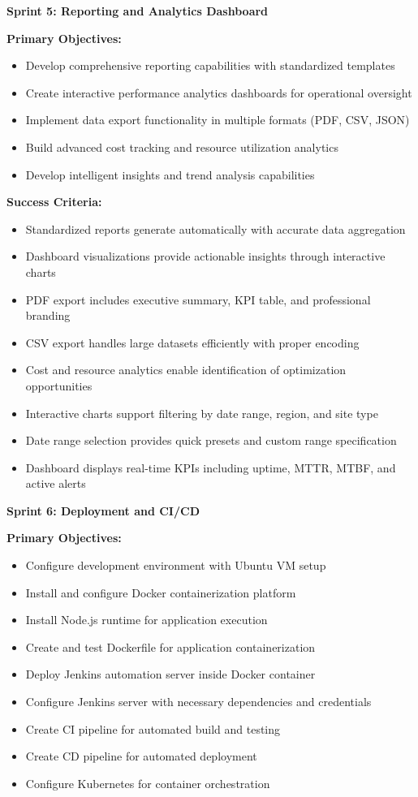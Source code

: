 \vspace{0.3cm}

\textbf{Sprint 5: Reporting and Analytics Dashboard}

\textbf{Primary Objectives:}
\begin{itemize}
\item Develop comprehensive reporting capabilities with standardized templates
\item Create interactive performance analytics dashboards for operational oversight
\item Implement data export functionality in multiple formats (PDF, CSV, JSON)
\item Build advanced cost tracking and resource utilization analytics
\item Develop intelligent insights and trend analysis capabilities
\end{itemize}

\textbf{Success Criteria:}
\begin{itemize}
\item Standardized reports generate automatically with accurate data aggregation
\item Dashboard visualizations provide actionable insights through interactive charts
\item PDF export includes executive summary, KPI table, and professional branding
\item CSV export handles large datasets efficiently with proper encoding
\item Cost and resource analytics enable identification of optimization opportunities
\item Interactive charts support filtering by date range, region, and site type
\item Date range selection provides quick presets and custom range specification
\item Dashboard displays real-time KPIs including uptime, MTTR, MTBF, and active alerts
\end{itemize}

\vspace{0.3cm}

\textbf{Sprint 6: Deployment and CI/CD}

\textbf{Primary Objectives:}
\begin{itemize}
\item Configure development environment with Ubuntu VM setup
\item Install and configure Docker containerization platform
\item Install Node.js runtime for application execution
\item Create and test Dockerfile for application containerization
\item Deploy Jenkins automation server inside Docker container
\item Configure Jenkins server with necessary dependencies and credentials
\item Create CI pipeline for automated build and testing
\item Create CD pipeline for automated deployment
\item Configure Kubernetes for container orchestration
\end{itemize}

